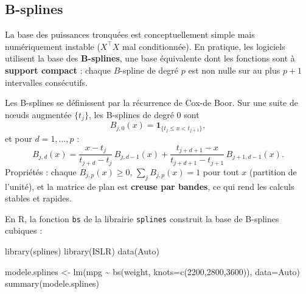 \documentclass[
  french,
  letterpaper,
  DIV=11,
  numbers=noendperiod]{scrreprt}
\newenvironment{Shaded}{\begin{snugshade}}{\end{snugshade}}
\newcommand{\AttributeTok}[1]{\textcolor[rgb]{0.40,0.45,0.13}{#1}}
\newcommand{\DecValTok}[1]{\textcolor[rgb]{0.68,0.00,0.00}{#1}}
\newcommand{\FunctionTok}[1]{\textcolor[rgb]{0.28,0.35,0.67}{#1}}
\newcommand{\NormalTok}[1]{\textcolor[rgb]{0.00,0.23,0.31}{#1}}
\newcommand{\OtherTok}[1]{\textcolor[rgb]{0.00,0.23,0.31}{#1}}
\newcommand{\SpecialCharTok}[1]{\textcolor[rgb]{0.37,0.37,0.37}{#1}}
\begin{document}
\subsection{B-splines}\label{sec-bsplines}

La base des puissances tronquées est conceptuellement simple mais
numériquement instable (\(X^\top X\) mal conditionnée). En pratique, les
logiciels utilisent la base des \textbf{B-splines}, une base équivalente
dont les fonctions sont à \textbf{support compact} : chaque \(B\)-spline
de degré \(p\) est non nulle sur au plus \(p+1\) intervalles
consécutifs.

Les B-splines se définissent par la récurrence de Cox-de Boor. Sur une
suite de nœuds augmentée \(\{t_j\}\), les B-splines de degré 0 sont
\[B_{j,0}(x) = \mathbf{1}_{\{t_j \leq x < t_{j+1}\}},\] et pour
\(d = 1,\ldots,p\) :
\[B_{j,d}(x) = \frac{x - t_j}{t_{j+d} - t_j}\,B_{j,d-1}(x) + \frac{t_{j+d+1} - x}{t_{j+d+1} - t_{j+1}}\,B_{j+1,d-1}(x).\]
Propriétés : chaque \(B_{j,p}(x) \geq 0\), \(\sum_j B_{j,p}(x) = 1\)
pour tout \(x\) (partition de l'unité), et la matrice de plan est
\textbf{creuse par bandes}, ce qui rend les calculs stables et rapides.

En R, la fonction \texttt{bs} de la librairie \texttt{splines} construit
la base de B-splines cubiques :

\begin{Shaded}
\begin{Highlighting}[]
\FunctionTok{library}\NormalTok{(splines)}
\FunctionTok{library}\NormalTok{(ISLR)}
\FunctionTok{data}\NormalTok{(Auto)}

\NormalTok{modele.splines }\OtherTok{\textless{}{-}} \FunctionTok{lm}\NormalTok{(mpg }\SpecialCharTok{\textasciitilde{}} \FunctionTok{bs}\NormalTok{(weight, }\AttributeTok{knots=}\FunctionTok{c}\NormalTok{(}\DecValTok{2200}\NormalTok{,}\DecValTok{2800}\NormalTok{,}\DecValTok{3600}\NormalTok{)), }\AttributeTok{data=}\NormalTok{Auto)}
\FunctionTok{summary}\NormalTok{(modele.splines)}
\end{Highlighting}
\end{Shaded}
\end{document}
